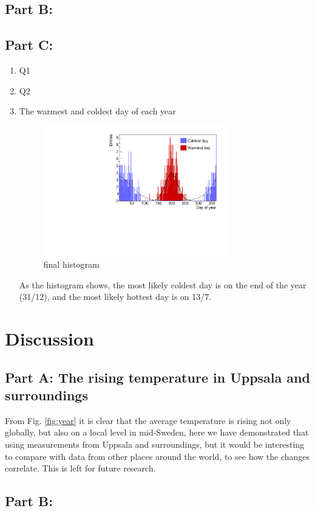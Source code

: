 \documentclass[a4paper]{article}
\begin{document}
\subsection{Part B:}

\subsection{Part C:}
\begin{enumerate}
\item Q1
\item Q2
\item The warmest and coldest day of each year
\begin{figure}[H]
    \centering
    \includegraphics[width=8cm]{./images/hotCold_Upp_final}
    \caption{final histogram}
    \label{fig:hist}
\end{figure}
As the histogram shows, the most likely coldest day is on the end of the year (31/12), and the most likely hottest day is on 13/7.

\end{enumerate}

\section{Discussion}
\subsection{Part A: The rising temperature in Uppsala and surroundings}
From Fig. \ref{fig:year} it is clear that the average temperature is rising not only globally, but also on a local level in mid-Sweden, here we have demonstrated that using measurements from Uppsala and surroundings, but it would be interesting to compare with data from other places around the world, to see how the changes correlate. This is left for future research.

\subsection{Part B:}
\end{document}
